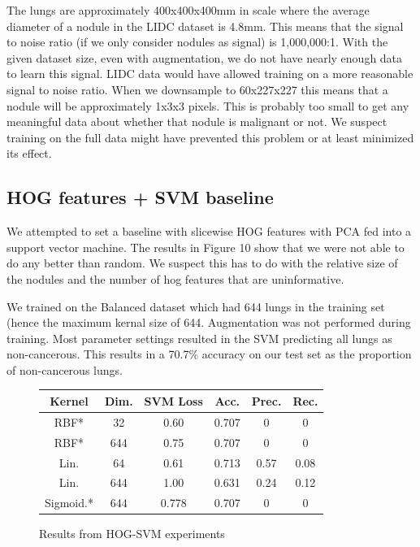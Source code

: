 \documentclass[twocolumn,10pt]{article}
\begin{document}
The lungs are approximately 400x400x400mm in scale where the average diameter of a nodule in the LIDC dataset is 4.8mm. This means that the signal to noise ratio (if we only consider nodules as signal) is 1,000,000:1. With the given dataset size, even with augmentation, we do not have nearly enough data to learn this signal. LIDC data would have allowed training on a more reasonable signal to noise ratio. When we downsample to 60x227x227 this means that a nodule will be approximately 1x3x3 pixels. This is probably too small to get any meaningful data about whether that nodule is malignant or not. We suspect training on the full data might have prevented this problem or at least minimized its effect.


\subsection{HOG features + SVM baseline}

We attempted to set a baseline with slicewise HOG features with PCA fed into a support vector machine. The results in Figure 10 show that we were not able to do any better than random. We suspect this has to do with the relative size of the nodules and the number of hog features that are uninformative. 

We trained on the Balanced dataset which had 644 lungs in the training set (hence the maximum kernal size of 644. Augmentation was not performed during training. Most parameter settings resulted in the SVM predicting all lungs as non-cancerous. This results in a 70.7\% accuracy on our test set as the proportion of non-cancerous lungs. 

\begin{figure}[H]
\label{svm_result}
\begin{center}
\begin{tabular}{|c|c|c|c|c|c|}
\hline
Kernel & Dim. & SVM Loss & Acc. & Prec. & Rec. \\ \hline
RBF* &  32 & 0.60 & 0.707 & 0 & 0 \\ 
RBF* & 644 & 0.75 & 0.707 & 0 & 0 \\
Lin. & 64 & 0.61 & 0.713 & 0.57 & 0.08 \\
Lin. & 644 & 1.00 & 0.631 & 0.24 & 0.12 \\
Sigmoid.* & 644 & 0.778 & 0.707 & 0 & 0 \\
\hline
\end{tabular}
\end{center}
\caption{Results from HOG-SVM experiments}
\end{figure}
\end{document}
